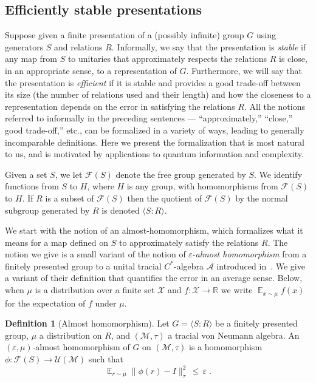 \documentclass[11pt]{article}
\theoremstyle{definition}
\newtheorem{definition}[theorem]{Definition}
\newcommand{\Id}{\ensuremath{I}}
\DeclareMathOperator*{\Expectation}{\mathbb{E}}
\newcommand{\Es}[1]{\Expectation_{#1}}
\newcommand{\R}{\ensuremath{\mathbb{R}}}
\newcommand{\mA}{\ensuremath{\mathcal{A}}}
\newcommand{\mF}{\ensuremath{\mathcal{F}}}
\newcommand{\mM}{\ensuremath{\mathcal{M}}}
\newcommand{\mU}{\ensuremath{\mathcal{U}}}
\newcommand{\mX}{\ensuremath{\mathcal{X}}}
\newcommand{\eps}{\varepsilon}
\begin{document}
\subsection{Efficiently stable presentations}

Suppose given a finite presentation of a (possibly infinite) group $G$ using generators $S$ and relations $R$. Informally, we say that the presentation is \emph{stable} if any map from $S$ to unitaries that approximately respects the relations $R$ is close, in an appropriate sense, to a representation of $G$. Furthermore, we will say that the presentation is \emph{efficient} if it is stable and provides a good trade-off between its size (the number of relations used and their length) and how the closeness to a representation depends on the error in satisfying the relations $R$. All the notions referred to informally in the preceding sentences --- ``approximately,'' ``close,'' good trade-off,'' etc., can be formalized in a variety of ways, leading to generally incomparable definitions. Here we present the formalization that is most natural to us, and is motivated by applications to quantum information and complexity. 


Given a set $S$, we let $\mF(S)$ denote the free group generated by $S$. We identify functions from $S$ to $H$, where $H$ is any group, with homomorphisms from $\mF(S)$ to $H$. If $R$ is a subset of $\mF(S)$ then the quotient of $\mF(S)$ by the normal subgroup generated by $R$ is denoted $\langle S:R\rangle$. 

We start with the notion of an almost-homomorphism, which formalizes what it means for a map defined on $S$ to approximately satisfy the relations $R$. The notion we give is a small variant of the notion of $\eps$-\emph{almost homomorphism} from a finitely presented group to a unital tracial $C^*$-algebra $\mA$ introduced in~\cite[Section 2]{hadwin2018stability}. %
We give a variant of their definition that quantifies the error in an average sense. Below, when $\mu$ is a distribution over a finite set $\mX$ and $f:\mX\to \R$ we write $\Es{x\sim \mu} f(x)$ for the expectation of $f$ under $\mu$. 

\begin{definition}[Almost homomorphism]\label{def:approx-hom}
Let $G = \langle S:R\rangle $ be a finitely presented group, $\mu$ a distribution on $R$, and $(\mM,\tau)$ a tracial von Neumann algebra. An $(\eps,\mu)$-almost homomorphism of $G$ on $(\mM,\tau)$ is a homomorphism $\phi:\mF(S)\to\mU(\mM)$ such that
\[ \Es{r\sim \mu} \big\|  \phi(r) - \Id \big \|_\tau^2 \,\leq\, \eps\;.\]
\end{definition}
\end{document}
